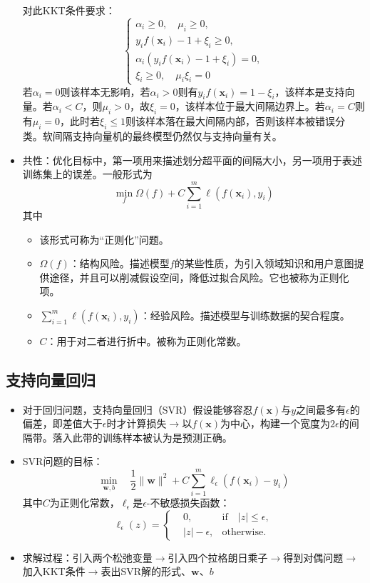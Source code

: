 \documentclass{ctexart}
\begin{document}
\begin{itemize}
						对此KKT条件要求：\[\left\{\begin{aligned}
						\alpha_i\ge0, \quad \mu_i\ge0,\\
						y_if(\bm{x}_i)-1+\xi_i\ge0,\\
						\alpha_i(y_if(\bm{x}_i)-1+\xi_i)=0,\\
						\xi_i\ge0,\quad \mu_i\xi_i=0
						\end{aligned}\right.\]若$\alpha_i=0$则该样本无影响，若$\alpha_i>0$则有$y_if(\bm{x}_i)=1-\xi_i$，该样本是支持向量。若$\alpha_i<C$，则$\mu_i>0$，故$\xi_i=0$，该样本位于最大间隔边界上。若$\alpha_i=C$则有$\mu_i=0$，此时若$\xi_i\le1$则该样本落在最大间隔内部，否则该样本被错误分类。软间隔支持向量机的最终模型仍然仅与支持向量有关。
						\item 共性：优化目标中，第一项用来描述划分超平面的间隔大小，另一项用于表述训练集上的误差。一般形式为\[\min\limits_{f}\Omega(f)+C\sum_{i=1}^{m}\ell(f(\bm{x}_i),y_i)\]其中\begin{itemize}
							\item 该形式可称为``正则化''问题。
							\item $\Omega(f)$：结构风险。描述模型$f$的某些性质，为引入领域知识和用户意图提供途径，并且可以削减假设空间，降低过拟合风险。它也被称为正则化项。
							\item $\sum_{i=1}^{m}\ell(f(\bm{x}_i),y_i)$：经验风险。描述模型与训练数据的契合程度。
							\item $C$：用于对二者进行折中。被称为正则化常数。
						\end{itemize}
					\end{itemize}
				\subsection{支持向量回归}
					\begin{itemize}
						\item 对于回归问题，支持向量回归（SVR）假设能够容忍$f(\bm{x})$与$y$之间最多有$\epsilon$的偏差，即差值大于$\epsilon$时才计算损失$\rightarrow$以$f(\bm{x})$为中心，构建一个宽度为$2\epsilon$的间隔带。落入此带的训练样本被认为是预测正确。
						\item SVR问题的目标：\[\min\limits_{\bm{w},b}\quad\frac{1}{2}\parallel\bm{w}\parallel^2+C\sum_{i=1}^{m}\ell_\epsilon(f(\bm{x}_i)-y_i)\]其中$C$为正则化常数，$\ell_\epsilon$是$\epsilon$-不敏感损失函数：\[\ell_\epsilon(z)=\left\{\begin{aligned}
						&0, & \mathrm{if}\quad|z|\le\epsilon,\\
						&|z|-\epsilon, & \mathrm{otherwise.}
						\end{aligned}\right.\]
						\item 求解过程：引入两个松弛变量$\rightarrow$引入四个拉格朗日乘子$\rightarrow$得到对偶问题$\rightarrow$加入KKT条件$\rightarrow$表出SVR解的形式、$\bm{w}$、$b$
					\end{itemize}
\end{document}
